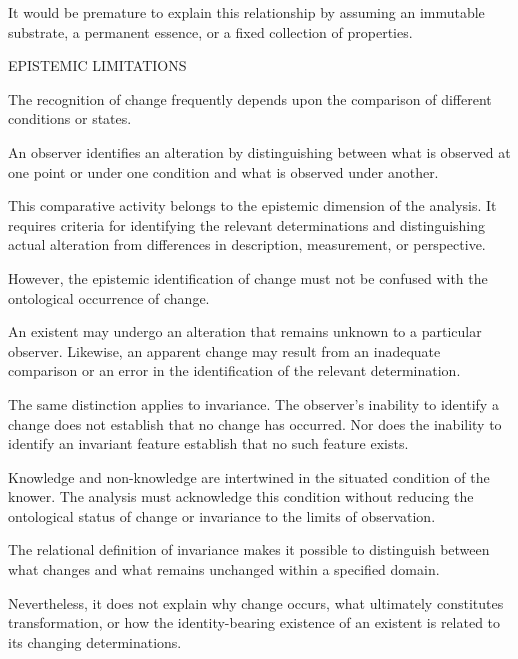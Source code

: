 It would be premature to explain this
relationship by assuming an immutable
substrate, a permanent essence, or a
fixed collection of properties.

	EPISTEMIC LIMITATIONS

The recognition of change frequently
depends upon the comparison of different
conditions or states.

An observer identifies an alteration
by distinguishing between what is
observed at one point or under one
condition and what is observed under
another.

This comparative activity belongs
to the epistemic dimension of the
analysis. It requires criteria for
identifying the relevant determinations
and distinguishing actual alteration
from differences in description,
measurement, or perspective.

However, the epistemic identification
of change must not be confused with
the ontological occurrence of change.

An existent may undergo an alteration
that remains unknown to a particular
observer. Likewise, an apparent change
may result from an inadequate comparison
or an error in the identification of
the relevant determination.

The same distinction applies to
invariance. The observer's inability
to identify a change does not establish
that no change has occurred. Nor does
the inability to identify an invariant
feature establish that no such feature
exists.

Knowledge and non-knowledge are
intertwined in the situated condition
of the knower. The analysis must
acknowledge this condition without
reducing the ontological status of
change or invariance to the limits
of observation.


The relational definition of invariance
makes it possible to distinguish
between what changes and what remains
unchanged within a specified domain.

Nevertheless, it does not explain
why change occurs, what ultimately
constitutes transformation, or how
the identity-bearing existence of
an existent is related to its changing
determinations.

